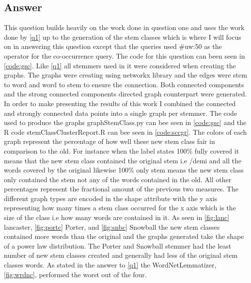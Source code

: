 \documentclass[11pt]{article}
\begin{document}
\subsection{Answer}
This question builds heavily on the work done in question one and uses the work done by \autoref{q1} up to the generation of the stem classes which is where I will focus on in answering this question except that the queries used \#uw:50 as the operator for the co-occurrence query. The code for this question can been seen in \autoref{code:gsc}.  Like \autoref{q1} all stemmers used in it were considered when creating the graphs. The graphs were creating using networkx library and the edges were stem to word and word to stem to ensure the connection. Both connected components and the strong connected components directed graph counterpart were generated. In order to make presenting the results of this work I combined the connected and strongly connected data points into a single graph per stemmer. The code used to produce the graphs graphStemClass.py can bee seen in  \autoref{code:gsc} and the R code stemClassClusterReport.R can bee seen in \autoref{code:sccgr}. \newline \newline \noindent 
The colors of each graph represent the percentage of how well these new stem class fair in comparison to the old. For instance when the label states 100\% fully covered it means that the new stem class contained the original stem i.e /demi and all the words covered by the original likewise 100\% only stem means the new stem class only contained the stem not any of the words contained in the old. All other percentages represent the fractional amount of the previous two measures. The different graph types are encoded in the shape attribute with the y axis representing how many times a stem class occurred for the x axis which is the size of the class i.e how many words are contained in it. 
\newline \newline \noindent  As seen in \autoref{fig:lanc} lancaster, \autoref{fig:portc} Porter, and \autoref{fig:snbc} Snowball the new stem classes contained more words than the original and the graphs generated take the shape of a power law distribution. The Porter and Snowball stemmer had the least number of new stem classes created and generally had less of the original stem classes words. As stated in the answer to  \autoref{q1} the WordNetLemmatizer, \autoref{fig:wrdnc}, performed the worst out of the four.
\end{document}
